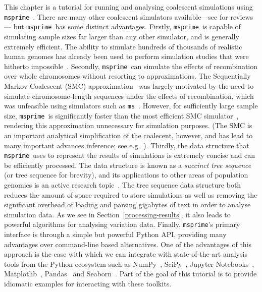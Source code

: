 \documentclass[graybox]{svmult}
\newcommand{\msprime}[0]{\texttt{msprime}}
\newcommand{\ms}[0]{\texttt{ms}}
\begin{document}
This chapter is a tutorial for running and analysing coalescent simulations
using \msprime~\citep{kelleher2016efficient}.
There are many other coalescent simulators available---see
\citep{carvajal2008simulation,liu2008survey,arenas2012simulation,
yuan2012overview,hoban2012computer} for reviews--- but \msprime\ has
some distinct advantages. Firstly, \msprime\ is capable of simulating
sample sizes far larger than any other simulator, and is generally
extremely efficient. The ability to simulate
hundreds of thousands of realistic human genomes has already been used
to perform simulation studies that were hitherto impossible~\citep{martin2017human}.
Secondly, \msprime\ can simulate the effects of recombination over
whole chromosomes without resorting to approximations. The
Sequentially Markov Coalescent (SMC)
approximation~\citep{mcvean2005approximating} was largely motivated by the
need to simulate chromosome-length sequences under the effects of
recombination,
which was unfeasible using simulators such as \ms~\citep{hudson2002generating}.
However, for sufficiently large sample size, \msprime\ is significantly
faster than the most efficient SMC simulator~\citep{staab2014scrm},
rendering this approximation unnecessary for simulation purposes. (The
SMC is an important analytical simplification of the coalecent, however, and has lead to many important advances inference; see e.g.~\citep{
li2011inference,
harris2013inferring,
schiffels2014inferring,
rasmussen2014genome}). Thirdly, the data structure that \msprime\ uses
to represent the results of simulations is extremely concise and
can be efficiently processed. The data structure is known as a
\emph{succinct tree sequence} (or tree sequence for brevity),
and its applications to other areas
of population genomics is an active research
topic~\citep{kelleher2018efficient}. The tree sequence data
structure both reduces the amount of space
required to store simulations as well as removing the significant
overhead of loading and parsing gigabytes of text in order to analyse
simulation data. As we see in Section~\ref{processing-results}, it also
leads to powerful algorithms for analysing variation data. Finally,
\msprime's primary interface is through a simple but powerful Python
API, providing many advantages over command-line based alternatives.
One of the advantages of this approach is the ease with which we
can integrate with state-of-the-art analysis tools from the Python
ecosystem such as NumPy~\citep{walt2011numpy}, SciPy~\citep{jones-2018-scipy},
Jupyter Notebooks~\citep{perez2007ipython},
Matplotlib~\citep{hunter2007matplotlib}, Pandas~\citep{mckinney2010data}
and Seaborn~\citep{michael_waskom_2017_883859}. Part of the goal
of this tutorial is to provide idiomatic examples for interacting
with these toolkits.
\end{document}
